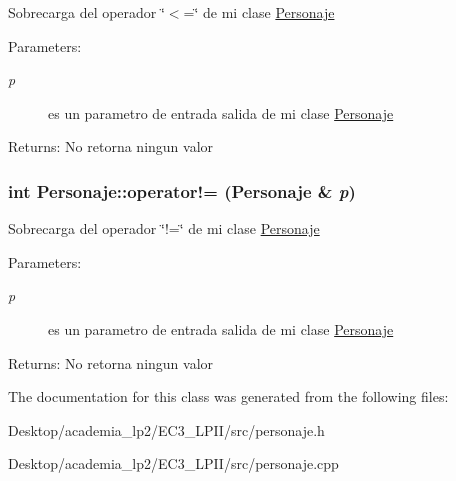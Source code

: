 Sobrecarga del operador \char`\"{}$<$=\char`\"{} de mi clase \hyperlink{classPersonaje}{Personaje} \begin{Desc}
\item[Parameters:]
\begin{description}
\item[{\em p}]es un parametro de entrada salida de mi clase \hyperlink{classPersonaje}{Personaje} \end{description}
\end{Desc}
\begin{Desc}
\item[Returns:]No retorna ningun valor \end{Desc}
\hypertarget{classPersonaje_be7f26619dd67133806688d4306d877e}{
\subsubsection[operator"!=]{\setlength{\rightskip}{0pt plus 5cm}int Personaje::operator!= ({\bf Personaje} \& {\em p})}}
\label{classPersonaje_be7f26619dd67133806688d4306d877e}


Sobrecarga del operador \char`\"{}!=\char`\"{} de mi clase \hyperlink{classPersonaje}{Personaje} \begin{Desc}
\item[Parameters:]
\begin{description}
\item[{\em p}]es un parametro de entrada salida de mi clase \hyperlink{classPersonaje}{Personaje} \end{description}
\end{Desc}
\begin{Desc}
\item[Returns:]No retorna ningun valor \end{Desc}


The documentation for this class was generated from the following files:\begin{CompactItemize}
\item 
Desktop/academia\_\-lp2/EC3\_\-LPII/src/personaje.h\item 
Desktop/academia\_\-lp2/EC3\_\-LPII/src/personaje.cpp\end{CompactItemize}
